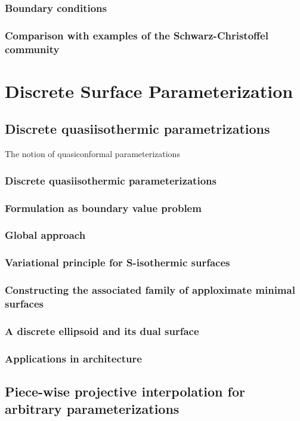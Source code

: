 \documentclass{book}
\begin{document}
\subsection{Boundary conditions}
\subsection{Comparison with examples of the Schwarz-Christoffel community}

\chapter{Discrete Surface Parameterization}


\section{Discrete quasiisothermic parametrizations}
The notion of quasiconformal parameterizations

\subsection{Discrete quasiisothermic parameterizations}

\subsection{Formulation as boundary value problem}
\subsection{Global approach}
\subsection{Variational principle for S-isothermic surfaces}
\subsection{Constructing the associated family of apploximate minimal surfaces}
\subsection{A discrete ellipsoid and its dual surface}
\subsection{Applications in architecture}

\section{Piece-wise projective interpolation for arbitrary parameterizations}
\end{document}
